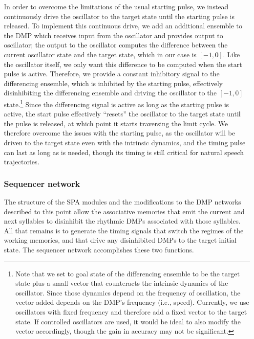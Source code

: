 In order to overcome the limitations
of the usual starting pulse,
we instead continuously drive
the oscillator to the target state
until the starting pulse is released.
To implement this continuous drive,
we add an additional ensemble
to the DMP which receives input
from the oscillator
and provides output to oscillator;
the output to the oscillator
computes the difference between
the current oscillator state
and the target state,
which in our case is $[-1, 0]$.
Like the oscillator itself,
we only want this difference
to be computed when the start pulse
is active.
Therefore, we provide a constant
inhibitory signal to the differencing ensemble,
which is inhibited by
the starting pulse,
effectively disinhibiting the differencing ensemble
and driving the oscillator
to the $[-1, 0]$ state.\footnote{
  Note that we set to goal state of the
  differencing ensemble to be the target state
  plus a small vector that counteracts the
  intrinsic dynamics of the oscillator.
  Since those dynamics depend on the frequency
  of oscillation, the vector added depends
  on the DMP's frequency (i.e., speed).
  Currently, we use oscillators with
  fixed frequency and therefore add a fixed vector
  to the target state.
  If controlled oscillators are used,
  it would be ideal to also modify
  the vector accordingly,
  though the gain in accuracy may not be significant.}
Since the differencing signal is active
as long as the starting pulse is active,
the start pulse effectively ``resets''
the oscillator to the target state
until the pulse is released,
at which point it starts
traversing the limit cycle.
We therefore overcome the issues with
the starting pulse,
as the oscillator will be driven
to the target state even
with the intrinsic dynamics,
and the timing pulse can
last as long as is needed,
though its timing is still critical
for natural speech trajectories.

\subsubsection{Sequencer network}

The structure of the SPA modules
and the modifications to the DMP networks
described to this point
allow the associative memories
that emit the current and next syllables
to disinhibit the rhythmic DMPs
associated with those syllables.
All that remains is to generate
the timing signals that switch
the regimes of the working memories,
and that drive any disinhibited DMPs
to the target initial state.
The sequencer network
accomplishes these two functions.


